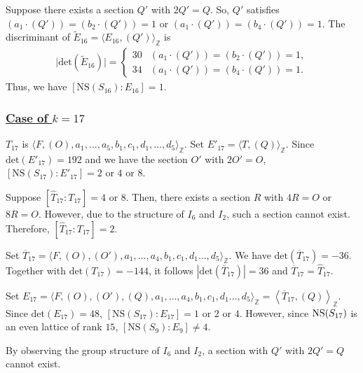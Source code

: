 \documentclass[10pt]{article}
\begin{document}
Suppose 
there exists a section $Q'$ with $2Q'=Q$.
So, $Q'$ satisfies
$
(a_1\cdot(Q')) = (b_2\cdot(Q')) =1 \text{ or }
(a_1\cdot(Q')) = ( b_4\cdot(Q')) =1.
$
The discriminant of $\widetilde{E}_{16}=\langle E_{16},(Q')\rangle_\mathbb{Z}$
is
\begin{align*}
\Big|\mathrm{det}\left(\widetilde{E}_{16}\right)\Big|=
\begin{cases}
30 & (a_1\cdot(Q')) = (b_2\cdot(Q')) =1,\\
34 & (a_1\cdot(Q')) = ( b_4\cdot(Q')) =1.
\end{cases}
\end{align*}
Thus, we have $[\mathrm{NS}(S_{16}):E_{16}]=1$.





\subsubsection*{\underline{Case   of  $k=17$}}


$T_{17}$ is $\langle F,(O),a_1,\dots,a_5,b_1,c_1,d_1,\dots,d_5\rangle_\mathbb{Z} $.
Set $E'_{17}=\langle T,(Q) \rangle_\mathbb{Z}$.
Since
$\mathrm{det}(E'_{17})=192$ and we have the section $O'$ with $2O'=O$,
$[\mathrm{NS}(S_{17}):E'_{17}]=2 \text{ or } 4 \text{ or } 8$.



Suppose
$\left[\widehat{T}_{17}:T_{17}\right]=4 \text{ or } 8$.
Then, there exists a section $R$ with $4R=O$ or $8R=O$.
However, due to the structure of $I_6$ and $I_2$,
such a section cannot exist.
Therefore, $\left[\widehat{T}_{17}:T_{17}\right]=2$.


Set $\overline{T}_{17}=\langle F,(O),(O'),a_1,\dots,a_4,b_1,c_1,d_1\dots,d_5\rangle_\mathbb{Z} $.
We have $\mathrm{det}\left(\overline{T}_{17}\right)=-36$.
Together with $\mathrm{det}(T_{17})=-144$,
it follows $|\mathrm{det}\left(\overline{T}_{17}\right)|=36$ and
$\overline{T}_{17}=\widehat{T}_{17}$.

Set
$E_{17}=\langle F,(O),(O'),(Q),a_1,\dots,a_4,b_1,c_1,d_1\dots,d_5\rangle_\mathbb{Z} =\left\langle \overline{T}_{17},(Q) \right\rangle_\mathbb{Z} $.
Since
$\mathrm{det}(E_{17})=48$,
$[\mathrm{NS}(S_{17}):E_{17}]=1 \text{ or } 2 \text{ or } 4$.
However, since ${{\rm NS} (S_{17})} $ is an even lattice of rank $15$,
$[\mathrm{NS}(S_9):E_9]\not= 4.$


By observing the group structure of $I_6$ and $I_2$,
a section with  $Q'$ with $2Q'=Q$ cannot exist.
\end{document}
